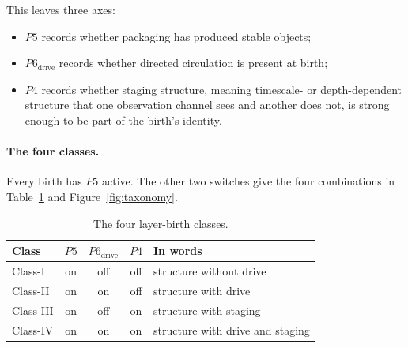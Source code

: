 This leaves three axes:
\begin{itemize}
  \item $P5$ records whether packaging has produced stable objects;
  \item $P6_{\mathrm{drive}}$ records whether directed circulation is present at birth;
  \item $P4$ records whether staging structure, meaning timescale- or depth-dependent structure that one observation channel sees and another does not, is strong enough to be part of the birth's identity.
\end{itemize}

\paragraph{The four classes.} Every birth has $P5$ active. The other two switches give the four combinations in Table~\ref{tab:canonical-layer-birth-classes} and Figure~\ref{fig:taxonomy}.

\begin{table}[tbp]
\centering
\caption{The four layer-birth classes.}
\label{tab:canonical-layer-birth-classes}
\begin{tabular}{@{}lcccl@{}}
\toprule
Class & $P5$ & $P6_{\mathrm{drive}}$ & $P4$ & In words \\
\midrule
Class-I   & on & off & off & structure without drive \\
Class-II  & on & on  & off & structure with drive \\
Class-III & on & off & on  & structure with staging \\
Class-IV  & on & on  & on  & structure with drive and staging \\
\bottomrule
\end{tabular}
\end{table}

